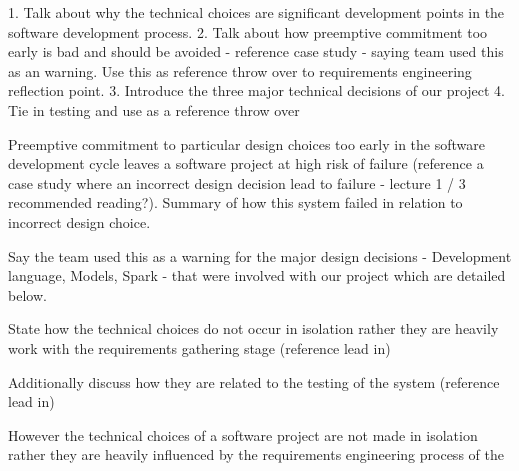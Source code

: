 \documentclass{l3proj}
\begin{document}




1. Talk about why the technical choices are significant development points in the software development process.
2. Talk about how preemptive commitment too early is bad and should be avoided - reference case study - saying team used this as an warning. Use this as reference throw over to requirements engineering reflection point. 
3. Introduce the three major technical decisions of our project
4. Tie in testing and use as a reference throw over

Preemptive commitment to particular design choices too early in the software development cycle leaves a software project at high risk of failure (reference a case study where an incorrect design decision lead to failure - lecture 1 / 3 recommended reading?). Summary of how this system failed in relation to incorrect design choice. 

Say the team used this as a warning for the major design decisions - Development language, Models, Spark - that were involved with our project which are detailed below.

State how the technical choices do not occur in isolation rather they are heavily work with the requirements gathering stage (reference lead in)

Additionally discuss how they are related to the testing of the system (reference lead in) 

However the technical choices of a software project are not made in isolation rather they are heavily influenced by the requirements engineering process of the 
\end{document}
